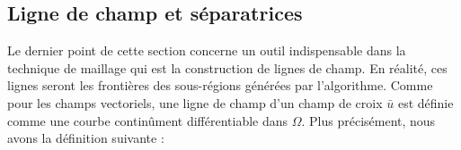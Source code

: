 \subsection{Ligne de champ et séparatrices}

Le dernier point de cette section concerne un outil indispensable dans la technique de maillage qui est la construction de lignes de champ. En réalité, ces lignes seront les frontières des sous-régions générées par l'algorithme.
Comme pour les champs vectoriels, une ligne de champ d'un champ de croix $\bar{u}$ est définie comme une courbe continûment différentiable dans $\Omega$. Plus précisément, nous avons la définition suivante :

